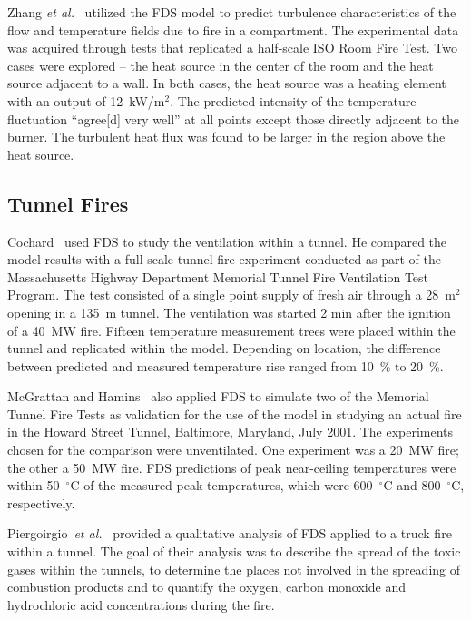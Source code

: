 Zhang {\em  et al.}~\cite{Zhang:2} utilized  the FDS model  to predict turbulence characteristics  of the flow and temperature  fields due to fire
in a compartment.   The experimental  data was  acquired through tests that replicated a half-scale ISO Room Fire Test.  Two cases were explored --
the heat  source in  the center  of the  room and  the heat source adjacent to a wall.  In both cases, the heat source was a heating element with an output of
12~kW/m$^2$.   The predicted  intensity
of  the temperature  fluctuation  ``agree[d] very well'' at  all points  except those directly  adjacent to  the burner. The turbulent heat flux was
found to be larger in the region above the heat source.


\subsection{Tunnel Fires}

Cochard~\cite{Cochard:1} used  FDS to  study the ventilation  within a tunnel. He  compared the model  results with a full-scale  tunnel fire
experiment conducted  as part of the  Massachusetts Highway Department Memorial Tunnel Fire Ventilation  Test Program.  The test consisted of a
single  point supply of  fresh air through  a 28~m$^2$ opening  in a 135~m tunnel.  The ventilation was started 2 min after the ignition of a  40~MW
fire.  Fifteen  temperature  measurement  trees were  placed within  the  tunnel and  replicated  within  the  model. Depending  on location,  the
difference between  predicted and  measured temperature rise ranged from 10~\% to 20~\%.

McGrattan and Hamins~\cite{McGrattan:HST} also applied FDS to simulate two of the Memorial Tunnel Fire Tests as validation for the use of the model
in  studying  an  actual  fire in  the  Howard  Street  Tunnel, Baltimore,  Maryland,  July  2001.  The  experiments  chosen  for  the comparison
were unventilated. One  experiment was  a 20~MW  fire; the other a 50~MW fire.  FDS predictions of peak near-ceiling temperatures were within
50~$^\circ$C of the measured peak temperatures, which were 600~$^\circ$C and 800~$^\circ$C, respectively.

Piergoirgio~{\em  et al.}~\cite{Piergiorgio:1} provided  a qualitative analysis of FDS applied to a  truck fire within a tunnel.  The goal of their
analysis  was to describe the  spread of the  toxic gases within the tunnels, to determine the  places not involved in the spreading of combustion
products  and to quantify  the oxygen, carbon  monoxide and hydrochloric acid concentrations during the fire.

